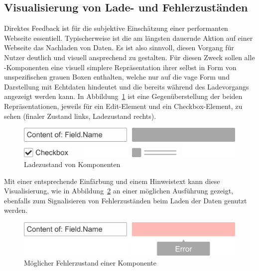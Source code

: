 \subsection{Visualisierung von Lade- und Fehlerzuständen}\label{subsec:loading_state_section}
Direktes Feedback ist für die subjektive Einschätzung einer performanten Webseite essentiell. Typischerweise ist die am längsten dauernde Aktion auf einer Webseite das Nachladen von Daten. Es ist also sinnvoll, diesen Vorgang für Nutzer deutlich und visuell ansprechend zu gestalten. Für diesen Zweck sollen alle -Komponenten eine visuell simplere Repräsentation ihrer selbst in Form von unspezifischen grauen Boxen enthalten, welche nur auf die vage Form und Darstellung mit Echtdaten hindeutet und die bereits während des Ladevorgangs angezeigt werden kann. In Abbildung~\ref{fig:comp_loading_final_comparison} ist eine Gegenüberstellung der beiden Repräsentationen, jeweils für ein Edit-Element und ein Checkbox-Element, zu sehen (finaler Zustand links, Ladezustand rechts).

\begin{figure}[hb]
    \centering
    \captionsetup{justification=centering}
    \includegraphics[width=\textwidth]{figures/comp_loading_final_comparison.png}
        \caption{Ladezustand von Komponenten}\label{fig:comp_loading_final_comparison}
\end{figure}

Mit einer entsprechende Einfärbung und einem Hinweistext kann diese Visualisierung, wie in Abbildung~\ref{fig:comp_possible_error_state} an einer möglichen Ausführung gezeigt, ebenfalls zum Signalisieren von Fehlerzuständen beim Laden der Daten genutzt werden.

\begin{figure}[hb]
    \centering
    \captionsetup{justification=centering}
    \includegraphics[width=\textwidth]{figures/comp_possible_error_state.png}
        \caption{Möglicher Fehlerzustand einer Komponente}\label{fig:comp_possible_error_state}
\end{figure}

